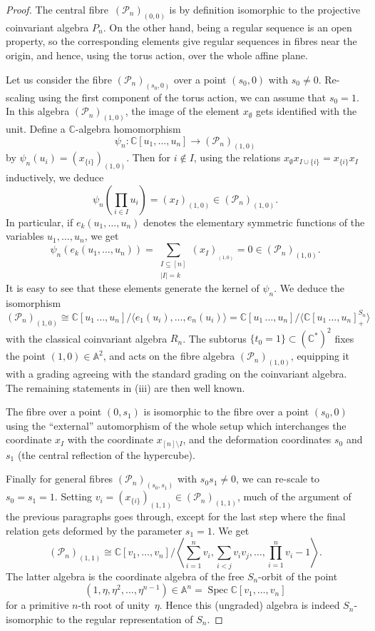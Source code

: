 \documentclass[a4paper,11pt]{amsart}
\theoremstyle{plain}
\theoremstyle{definition}
\newcommand{\A}{\mathbb{A}}
\newcommand{\C}{\mathbb{C}}
\newcommand{\CP}{\mathscr{P}}
\DeclareMathOperator{\Spec}{Spec}
\begin{document}
\begin{proof}

The central fibre~$(\CP_n)_{(0,0)}$ is by definition isomorphic to the projective coinvariant algebra $P_n$. On the other hand, being a regular sequence is an open property, so the corresponding elements give regular sequences in fibres near the origin, and hence, using the torus action, over the whole affine plane. 

Let us consider the fibre $(\CP_n)_{(s_0,0)}$ over a point $(s_0, 0)$ with $s_0\neq 0$. Re-scaling using the first component of the torus action, we can assume that $s_0=1$. In this algebra $(\CP_n)_{(1,0)}$, the image of the element $x_{\scriptscriptstyle \emptyset}$ gets identified with the unit. Define a $\C$-algebra homomorphism 
\[\psi_n\colon \C[u_1, \ldots, u_n]\to (\CP_n)_{(1,0)}\]
by $\psi_n(u_i)=(x_{\scriptscriptstyle\{i\}})_{(1,0)}$. Then for $i\not\in I$, using the relations $x_{\scriptscriptstyle\emptyset} x_{\scriptscriptstyle I\cup \{i\}} = x_{\scriptscriptstyle\{i\}} x_{\scriptscriptstyle I}$ inductively, we deduce 
\[\psi_n\left(\prod_{i\in I} u_i\right) = (x_{\scriptscriptstyle I})_{(1,0)}  \in (\CP_n)_{(1,0)}.\]
In particular, if $e_k(u_1,\ldots, u_n)$ denotes the elementary symmetric functions of the variables $u_1, \ldots, u_n$, we get
\[\psi_n\left(e_k(u_1,\ldots, u_n)\right) = \sum_{\substack{I\subseteq[n]\\|I|=k}} (x_{\scriptscriptstyle I})_{_{(1,0)}} =  0\in (\CP_n)_{(1,0)}.\]
It is easy to see that these elements generate the kernel of $\psi_n$. We deduce the isomorphism 
\[ (\CP_n)_{(1,0)} \cong  \C[u_1\,\ldots, u_n]/\langle e_1(u_i), \ldots, e_n(u_i)\rangle = \C[u_1\,\ldots, u_n]/\langle \C[u_1\,\ldots, u_n]^{S_n}_+\rangle
\]
with the classical coinvariant algebra $R_n$. 
The subtorus $\{t_0=1\}\subset (\C^*)^2$ fixes the point $(1,0)\in\A^2$, and acts on the fibre algebra $(\CP_n)_{(1,0)}$, equipping it  with a grading agreeing with the standard grading on the coinvariant algebra. The remaining statements in (iii) are then well known. 

The fibre over a point $(0, s_1)$ is isomorphic to the fibre over a point $(s_0, 0)$ using the ``external'' automorphism of the whole setup which interchanges the coordinate $x_{\scriptscriptstyle I}$ with the coordinate $x_{\scriptscriptstyle [n]\setminus I}$, and the deformation coordinates $s_0$ and $s_1$ (the central reflection of the hypercube). 

Finally for general fibres $(\CP_n)_{(s_0,s_1)}$ with $s_0s_1\neq 0$, we can re-scale to $s_0=s_1=1$. Setting $v_i=(x_{\{i\}})_{(1,1)}\in(\CP_n)_{(1,1)}$, much of the argument of the previous paragraphs goes through, except for the last step where the final relation gets deformed by the parameter $s_1=1$. We get
\[ (\CP_n)_{(1,1)}\cong\C[v_1, \ldots, v_n]\Big/\left\langle \sum_{i=1}^n v_i, \sum_{i<j} v_iv_j, \ldots, \prod_{i=1}^n v_i -1\right\rangle. \]
The latter algebra is the coordinate algebra of the free $S_n$-orbit of the point 
\[(1, \eta, \eta^2, \ldots, \eta^{n-1})\in\A^n = \Spec\C[v_1, \ldots, v_n]\]
for a primitive $n$-th root of unity~$\eta$. Hence this (ungraded) algebra is indeed $S_n$-isomorphic to the regular representation of $S_n$.  


\end{proof}
\end{document}
